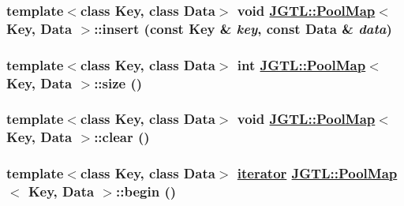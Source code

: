 \hypertarget{class_j_g_t_l_1_1_pool_map_669bf1d78e81cdd09fb6d2b1aea4ce9a}{
\subsubsection[insert]{\setlength{\rightskip}{0pt plus 5cm}template$<$class Key, class Data$>$ void \hyperlink{class_j_g_t_l_1_1_pool_map}{JGTL::Pool\-Map}$<$ Key, Data $>$::insert (const Key \& {\em key}, const Data \& {\em data})}}
\label{class_j_g_t_l_1_1_pool_map_669bf1d78e81cdd09fb6d2b1aea4ce9a}


\hypertarget{class_j_g_t_l_1_1_pool_map_d9936165993f004d6c8b8aca4614e522}{
\subsubsection[size]{\setlength{\rightskip}{0pt plus 5cm}template$<$class Key, class Data$>$ int \hyperlink{class_j_g_t_l_1_1_pool_map}{JGTL::Pool\-Map}$<$ Key, Data $>$::size ()}}
\label{class_j_g_t_l_1_1_pool_map_d9936165993f004d6c8b8aca4614e522}


\hypertarget{class_j_g_t_l_1_1_pool_map_e89e7a5f21139dd6dd927d1898bb9f7c}{
\subsubsection[clear]{\setlength{\rightskip}{0pt plus 5cm}template$<$class Key, class Data$>$ void \hyperlink{class_j_g_t_l_1_1_pool_map}{JGTL::Pool\-Map}$<$ Key, Data $>$::clear ()}}
\label{class_j_g_t_l_1_1_pool_map_e89e7a5f21139dd6dd927d1898bb9f7c}


\hypertarget{class_j_g_t_l_1_1_pool_map_2a375fae39774d1abe87588cffc9411a}{
\subsubsection[begin]{\setlength{\rightskip}{0pt plus 5cm}template$<$class Key, class Data$>$ \hyperlink{class_j_g_t_l_1_1_pool_map_b3af40821696ebcf9f62a3e9d91324ee}{iterator} \hyperlink{class_j_g_t_l_1_1_pool_map}{JGTL::Pool\-Map}$<$ Key, Data $>$::begin ()}}
\label{class_j_g_t_l_1_1_pool_map_2a375fae39774d1abe87588cffc9411a}


